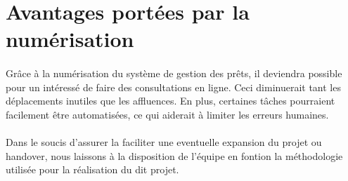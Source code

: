     \section{Avantages portées par la numérisation}
\paragraph{}
Grâce à la numérisation du système de gestion des prêts,
il deviendra possible pour un intéressé de faire des consultations
en ligne. Ceci diminuerait tant les déplacements inutiles que les 
affluences. En plus, certaines tâches pourraient facilement être 
automatisées, ce qui aiderait à limiter les erreurs humaines.   
\paragraph{}
Dans le soucis d'assurer la faciliter une eventuelle expansion du projet ou handover, nous laissons à la disposition de l'équipe en fontion la méthodologie utilisée pour la réalisation du dit projet.